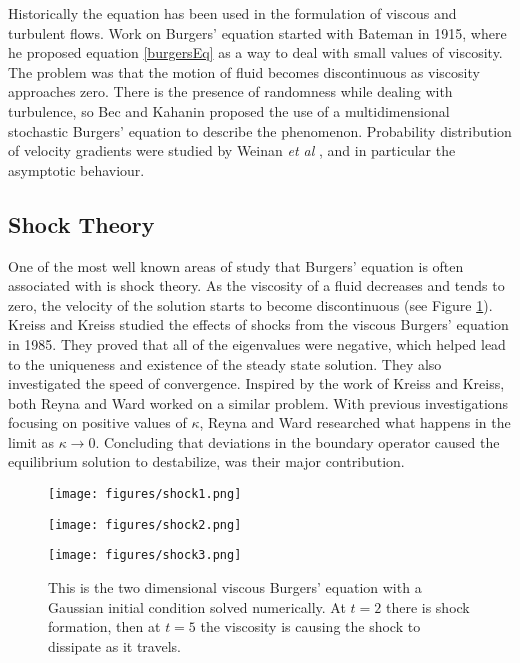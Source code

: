 \documentclass[undefended]{sfuthesis}
\begin{document}
Historically the equation has been used in the formulation of viscous and turbulent flows. Work on Burgers' equation started with Bateman \cite{bateman} in 1915, where he proposed equation \eqref{burgersEq} as a way to deal with small values of viscosity. The problem was that the motion of fluid becomes discontinuous as viscosity approaches zero. There is the presence of randomness while dealing with turbulence, so Bec and Kahanin \cite{stochasticBurgers} proposed the use of a multidimensional stochastic Burgers' equation to describe the phenomenon. Probability distribution of velocity gradients were studied by Weinan \textit{et al} \cite{fluidDynamics3}, and in particular the asymptotic behaviour. 

\subsection{Shock Theory}

One of the most well known areas of study that Burgers' equation is often associated with is shock theory. As the viscosity of a fluid decreases and tends to zero, the velocity of the solution starts to become discontinuous (see Figure \ref{fig:shockTheory}). Kreiss and Kreiss \cite{shockTheory} studied the effects of shocks from the viscous Burgers' equation in 1985. They proved that all of the eigenvalues were negative, which helped lead to the uniqueness and existence of the steady state solution. They also investigated the speed of convergence. Inspired by the work of Kreiss and Kreiss, both Reyna and Ward \cite{shockTheory2} worked on a similar problem. With previous investigations focusing on positive values of $\kappa$, Reyna and Ward researched what happens in the limit as $\kappa \to 0.$ Concluding that deviations in the boundary operator caused the equilibrium solution to destabilize, was their major contribution.

\begin{figure}[h!]
	\begin{minipage}{0.32\textwidth}
	\texttt{[image: figures/shock1.png]}
	\end{minipage}\hfill
	\begin{minipage}{0.32\textwidth}
	\texttt{[image: figures/shock2.png]}
	\end{minipage}\hfill
	\begin{minipage}{0.32\textwidth}%
	\texttt{[image: figures/shock3.png]}
	\end{minipage}
	\caption{This is the two dimensional viscous Burgers' equation with a Gaussian initial condition solved numerically. At $t = 2$ there is shock formation, then at $t = 5$ the viscosity is causing the shock to dissipate as it travels.}
	\label{fig:shockTheory}
\end{figure}
\end{document}
